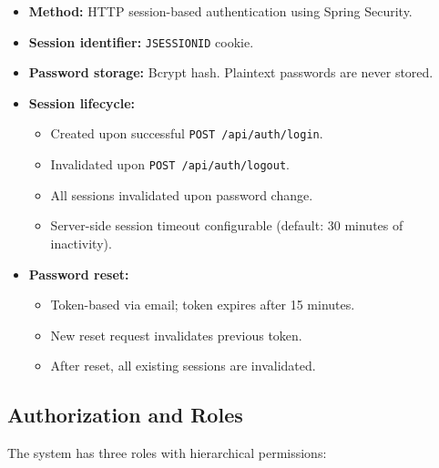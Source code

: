 \documentclass[11pt,a4paper]{article}
\begin{document}
\begin{itemize}[leftmargin=1.5em]
    \item \textbf{Method:} HTTP session-based authentication using Spring Security.
    \item \textbf{Session identifier:} \texttt{JSESSIONID} cookie.
    \item \textbf{Password storage:} Bcrypt hash. Plaintext passwords are never stored.
    \item \textbf{Session lifecycle:}
    \begin{itemize}
        \item Created upon successful \texttt{POST /api/auth/login}.
        \item Invalidated upon \texttt{POST /api/auth/logout}.
        \item All sessions invalidated upon password change.
        \item Server-side session timeout configurable (default: 30 minutes of inactivity).
    \end{itemize}
    \item \textbf{Password reset:}
    \begin{itemize}
        \item Token-based via email; token expires after 15 minutes.
        \item New reset request invalidates previous token.
        \item After reset, all existing sessions are invalidated.
    \end{itemize}
\end{itemize}

\subsection{Authorization and Roles}

The system has three roles with hierarchical permissions:
\end{document}
